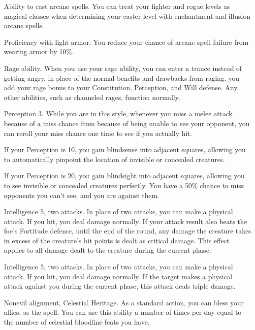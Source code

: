 \featpre Ability to cast arcane spells.
\featben You can treat your fighter and rogue levels as magical classes when determining your caster level with enchantment and illusion arcane spells.

\featpre Proficiency with light armor.
\featben You reduce your chance of arcane spell failure from wearing armor by 10\%.

\featpre Rage ability.
\featben When you use your rage ability, you can enter a trance instead of getting angry.
in place of the normal benefits and drawbacks from raging, you add your rage bonus to your Constitution, Perception, and Will defense.
Any other abilities, such as channeled rages, function normally.

\featpre Perception 3.
\featben While you are in this style, whenever you miss a melee attack because of a miss chance from because of being unable to see your opponent, you can reroll your miss chance one time to see if you actually hit.
\par If your Perception is 10, you gain blindsense into adjacent squares, allowing you to automatically pinpoint the location of invisible or concealed creatures.
\par If your Perception is 20, you gain blindsight into adjacent squares, allowing you to see invisible or concealed creatures perfectly.
You have a 50\% chance to miss opponents you can't see, and you are  against them.

\featpre Intelligence 5, two attacks.
\featben In place of two attacks, you can make a physical attack.
If you hit, you deal damage normally.
If your attack result also beats the foe's Fortitude defense, until the end of the round, any damage the creature takes in excess of the creature's hit points is dealt as critical damage.
This effect applies to all damage dealt to the creature during the current phase.

\featpre Intelligence 5, two attacks.
\featben In place of two attacks, you can make a physical attack.
If you hit, you deal damage normally.
If the target makes a physical attack against you during the current phase, this attack deals triple damage.

\featpres
Nonevil alignment, Celestial Heritage.
\featben As a standard action, you can bless your allies, as the 
spell.
You can use this ability a number of times per day equal to the number of celestial bloodline feats you have.

